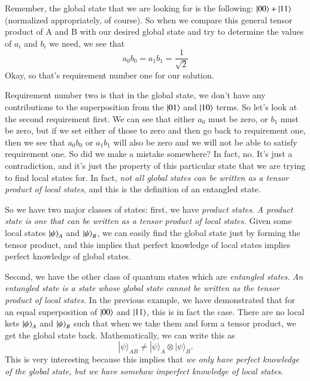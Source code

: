 Remember, the global state that we are looking for is the following: $\left| 00 \right\rangle+\left| 11 \right\rangle$ (normalized appropriately, of course). 
So when we compare this general tensor product of A and B with our desired global state and try to determine the values of $a_i$ and $b_i$ we need, we see that
\begin{equation}
a_{0} b_{0}=a_{1} b_{1}=\frac{1}{\sqrt{2}}
\end{equation}
Okay, so that's requirement number one for our solution.

Requirement number two is that in the global state, we don't have any contributions to the superposition from the $\left| 01 \right\rangle$ and $\left| 10 \right\rangle$ terms. So let's look at the second requirement first. We can see that either $a_0$ must be zero, or $b_1$ must be zero, but if we set either of those to zero and then go back to requirement one, then we see that $a_0 b_0$ or $a_1 b_1$ will also be zero and we will not be able to satisfy requirement one.
So did we make a mistake somewhere? In fact, no. It's just a contradiction, and it's just the property of this particular state that we are trying to find local states for. In fact, \emph{not all global states can be written as a tensor product of local states}, and this is the definition of an entangled state.

So we have two major classes of states: first, we have \emph{product states}. %
\emph{A product state is one that can be written as a tensor product of local states.} Given some local states $\left| \psi \right\rangle_A$ and $\left| \psi \right\rangle_B$, we can easily find the global state just by forming the tensor product, and this implies that perfect knowledge of local states implies perfect knowledge of global states.

Second, we have the other class of quantum states which are \emph{entangled states}. \emph{An entangled state is a state whose global state cannot be written as the tensor product of local states.} In the previous example, we have demonstrated that for an equal superposition of $\left| 00 \right\rangle$ and $\left| 11 \right\rangle$, this is in fact the case. There are no local kets $\left| \psi \right\rangle_A$ and $\left| \psi \right\rangle_B$ such that when we take them and form a tensor product, we get the global state back. Mathematically, we can write this as
\begin{equation}
|\psi\rangle_{A B} \neq|\psi\rangle_{A} \otimes|\psi\rangle_{B}.
\end{equation}
This is very interesting because this implies that \emph{we only have perfect knowledge of the global state, but we have somehow imperfect knowledge of local states}.

